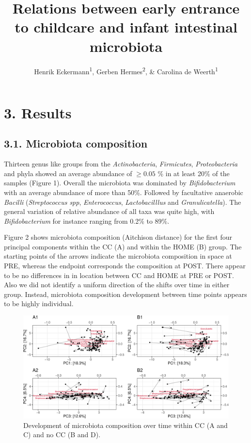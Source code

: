 \documentclass[,man]{apa6}
\title{Relations between early entrance to childcare and infant intestinal
microbiota}
\author{Henrik Eckermann\textsuperscript{1}, Gerben Hermes\textsuperscript{2},
\& Carolina de Weerth\textsuperscript{1}}
\date{}
\affiliation{
\vspace{0.5cm}
\textsuperscript{1} Radboud University Nijmegen\\\textsuperscript{2} Wageningen University}
\begin{document}
\maketitle

\section{3. Results}\label{results}

\subsection{3.1. Microbiota composition}\label{microbiota-composition}

Thirteen genus like groups from the \emph{Actinobacteria},
\emph{Firmicutes}, \emph{Proteobacteria} and phyla showed an average
abundance of \(\geq 0.05\) \% in at least 20\% of the samples (Figure
1). Overall the microbiota was dominated by \emph{Bifidobacterium} with
an average abundance of more than 50\%. Followed by facultative
anaerobic \emph{Bacilli} (\emph{Streptococcus spp}, \emph{Enterococcus},
\emph{Lactobacilllus} and \emph{Granulicatella}). The general variation
of relative abundance of all taxa was quite high, with
\emph{Bifidobacterium} for instance ranging from 0.2\% to 89\%.

Figure 2 shows microbiota composition (Aitchison distance) for the first
four principal components within the CC (A) and within the HOME (B)
group. The starting points of the arrows indicate the microbiota
composition in space at PRE, whereas the endpoint corresponds the
composition at POST. There appear to be no differences in in location
between CC and HOME at PRE or POST. Also we did not identify a uniform
direction of the shifts over time in either group. Instead, microbiota
composition development between time points appears to be highly
individual.

\begin{figure}
\centering
\includegraphics{index_files/figure-latex/unnamed-chunk-7-1.pdf}
\caption{\label{fig:unnamed-chunk-7}Development of microbiota composition
over time within CC (A and C) and no CC (B and D).}
\end{figure}
\end{document}
